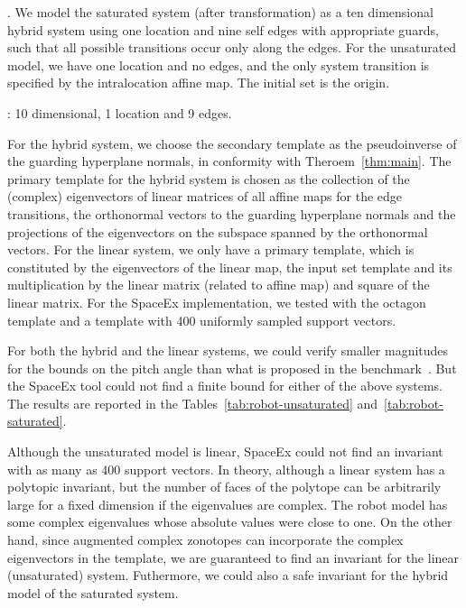 .  We model the saturated system (after transformation)
as a ten dimensional hybrid system using one location and nine self
edges with appropriate guards, such that all possible transitions
occur only along the edges.  For the unsaturated model, we have one
location and no edges, and the only system transition is specified by
the intralocation affine map.  The initial set is the origin.

: 10 dimensional, 1 location and 9 edges.

  For the hybrid system, we choose the secondary
template as the pseudoinverse of the guarding hyperplane normals, in
conformity with Theroem~\ref{thm:main}.  The primary template for the
hybrid system is chosen as the collection of the (complex) eigenvectors of
linear matrices of all affine maps for the edge transitions, the
orthonormal vectors to the guarding hyperplane normals and the
projections of the eigenvectors on the subspace spanned by the
orthonormal vectors.  For the linear system, we only have a primary
template, which is constituted by the eigenvectors of the linear map,
the input set template and its multiplication by the linear matrix
(related to affine map) and square of the linear matrix.  For the
SpaceEx implementation, we tested with the octagon template and a
template with 400 uniformly sampled support vectors.


  For both the hybrid and the linear systems, we could
verify smaller magnitudes for the bounds on the pitch angle than what
is proposed in the benchmark~\cite{heinz2014benchmark}.  But the
SpaceEx tool could not find a finite bound for either of the above
systems.  The results are reported in the
Tables~\ref{tab:robot-unsaturated} and~\ref{tab:robot-saturated}.

  Although the unsaturated model is linear,
SpaceEx could not find an invariant with as many as 400 support
vectors.  In theory, although a linear system has a polytopic
invariant, but the number of faces of the polytope can be arbitrarily
large for a fixed dimension if the eigenvalues are complex.  The
robot model has some complex eigenvalues whose absolute values were
close to one.  On the other hand, since augmented complex zonotopes
can incorporate the complex eigenvectors in the template, we are
guaranteed to find an invariant for the linear (unsaturated) system.
Futhermore, we could also a safe invariant for the hybrid model of the
saturated system.

